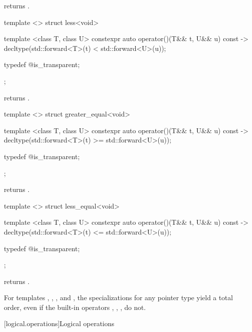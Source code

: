\begin{itemdescr}
\pnum
{} returns .
\end{itemdescr}

%
\begin{itemdecl}
template <> struct less<void> {
  template <class T, class U> constexpr auto operator()(T&& t, U&& u) const
    -> decltype(std::forward<T>(t) < std::forward<U>(u));

  typedef @\unspec@ is_transparent;
};
\end{itemdecl}

\begin{itemdescr}
\pnum
{} returns .
\end{itemdescr}

%
\begin{itemdecl}
template <> struct greater_equal<void> {
  template <class T, class U> constexpr auto operator()(T&& t, U&& u) const
    -> decltype(std::forward<T>(t) >= std::forward<U>(u));

  typedef @\unspec@ is_transparent;
};
\end{itemdecl}

\begin{itemdescr}
\pnum
{} returns .
\end{itemdescr}

%
\begin{itemdecl}
template <> struct less_equal<void> {
  template <class T, class U> constexpr auto operator()(T&& t, U&& u) const
    -> decltype(std::forward<T>(t) <= std::forward<U>(u));

  typedef @\unspec@ is_transparent;
};
\end{itemdecl}

\begin{itemdescr}
\pnum
{} returns .
\end{itemdescr}

\pnum
For templates , , , and
, the specializations for any pointer type yield a total order,
even if the built-in operators \tcode{<}, \tcode{>}, \tcode{<=}, \tcode{>=}
do not.

[logical.operations]{Logical operations}

